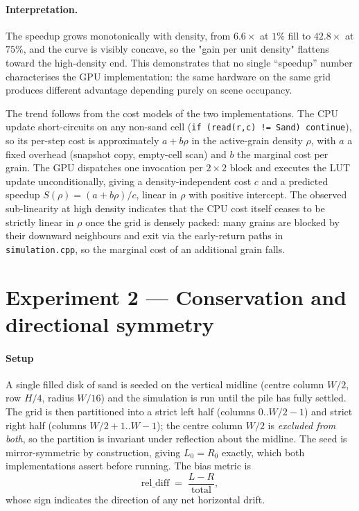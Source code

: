 \documentclass[oneside, a4paper, onecolumn, 11pt]{article}
\begin{document}
\paragraph{Interpretation.}
The speedup grows monotonically with density, from $6.6\times$ at
$1\%$ fill to $42.8\times$ at $75\%$, and the curve is visibly concave, so
the "gain per unit density" flattens toward the high-density end.
This demonstrates that no single ``speedup'' number characterises the
GPU implementation: the same hardware on the same grid produces different
advantage depending purely on
scene occupancy.

The trend follows from the cost models of the two implementations. The
CPU update short-circuits on any non-sand cell
(\texttt{if (read(r,c) != Sand) continue}), so its per-step cost is
approximately $a + b\rho$ in the active-grain density $\rho$, with $a$
a fixed overhead (snapshot copy, empty-cell scan) and $b$ the marginal
cost per grain. The GPU dispatches one invocation per $2\times 2$
block and executes the LUT update unconditionally, giving a
density-independent cost $c$ and a predicted speedup
$S(\rho)=(a+b\rho)/c$, linear in $\rho$ with positive intercept. The
observed sub-linearity at high density indicates that the CPU cost
itself ceases to be strictly linear in $\rho$ once the grid is densely
packed: many grains are blocked by their downward neighbours and exit
via the early-return paths in \texttt{simulation.cpp}, so the marginal
cost of an additional grain falls.


\section{Experiment 2 --- Conservation and directional symmetry}
\label{sec:exp2}


\paragraph{Setup}
A single filled disk of sand is seeded on the vertical midline
(centre column $W/2$, row $H/4$, radius $W/16$) and the
simulation is run until the pile has fully settled. The grid is then
partitioned into a strict left half (columns $0..W/2-1$) and strict
right half (columns $W/2+1..W-1$); the centre column $W/2$ is
\emph{excluded from both}, so the partition is invariant under
reflection about the midline. The seed is mirror-symmetric by
construction, giving $L_0=R_0$ exactly, which both implementations
assert before running. The bias metric is
\[
  \mathrm{rel\_diff} \;=\; \frac{L-R}{\text{total}},
\]
whose sign indicates the direction of any net horizontal drift.
\end{document}
